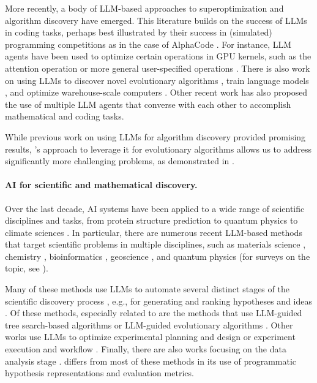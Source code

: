 More recently, a body of LLM-based approaches to superoptimization and algorithm discovery have emerged.
This literature builds on the success of LLMs in coding tasks, perhaps best illustrated by their success in (simulated) programming competitions as in the case of AlphaCode \citep{li2022competitionlevel}.
For instance, LLM agents have been used to optimize certain operations in GPU kernels, such as the attention operation \citep{chen2025automating} or more general user-specified operations \citep{lange2025aicuda}.
There is also work on using LLMs to discover novel evolutionary algorithms \citep{lange2024large}, train language models \citep{lehman2024evolution}, and optimize warehouse-scale computers \citep{lin2025eco}.
Other recent work \citep{wu2023autogen} has also proposed the use of multiple LLM agents that converse with each other to accomplish mathematical and coding tasks. 

While previous work on using LLMs for algorithm discovery provided promising results, \method's approach to leverage it for evolutionary algorithms allows us to address significantly more challenging problems, as demonstrated in .

\paragraph{AI for scientific and mathematical discovery.}
Over the last decade, AI systems have been applied to a wide range of scientific disciplines and tasks, from protein structure prediction \citep{jumper2021highly} to quantum physics \citep{bausch2024learning,ruiz2025quantum} to climate sciences \citep{lam2023learning}.
In particular, there are numerous recent LLM-based methods that target scientific problems in multiple disciplines, such as materials science \citep{miret2024llms,zhang2024honeycomb,jia2024llmatdesign,song2025llmfeynman}, chemistry \citep{caldasramos2025review,luo2025leveraging}, bioinformatics \citep{sarumi2024large,madani2023large}, geoscience \citep{pantiukhin2025accelerating}, and quantum physics \citep{frohnert2025discovering,pan2025quantum} (for surveys on the topic, see \citep{gridach2025agentic,luo2025llm4sr,ren2025towards}).

Many of these methods use LLMs to automate several distinct stages of the scientific discovery process \citep{wang2024scimon,xia2025nature,li2025large,gu2024interesting,yang2024large}, e.g., for generating and ranking hypotheses and ideas \citep{guo2024embracing,si2025canllms}.
Of these methods, especially related to \method are the methods that use LLM-guided tree search-based algorithms \citep{bran2025chemical} or LLM-guided evolutionary algorithms \cite{yang2025moosechem,zhou2024hypothesis,gottweis2025towards}.
Other works use LLMs to optimize experimental planning and design \citep{huang2024crisprgpt,bran2024augmenting,boiko2023autonomous,naumov2025dora} or experiment execution and workflow \citep{wang2025efficient,rives2021biological,lin2023evolutionary,ye2023drugassist,ferruz2022controllable}.
Finally, there are also works focusing on the data analysis stage \citep{rasheed2024canlarge}.
\method differs from most of these methods in its use of programmatic hypothesis representations and evaluation metrics.

